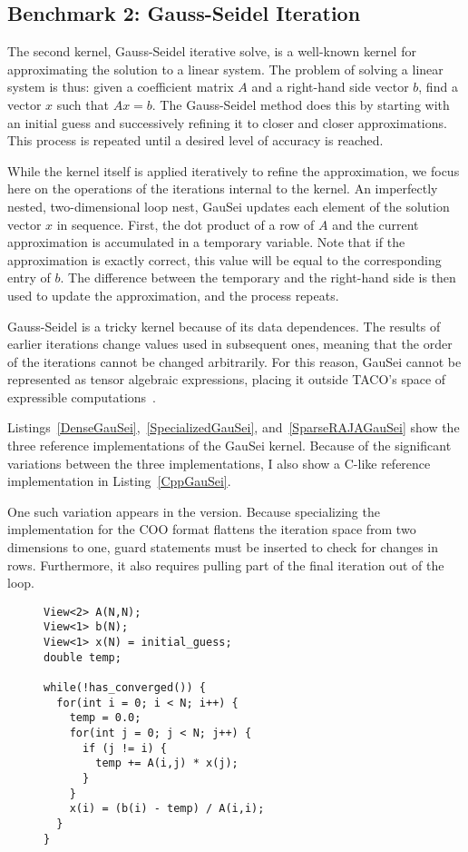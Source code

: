 \subsection{Benchmark 2: Gauss-Seidel Iteration}

The second kernel, Gauss-Seidel iterative solve, is a well-known kernel for approximating the solution to a linear system.
The problem of solving a linear system is thus: given a coefficient matrix $A$ and a right-hand side vector $b$, find a vector $x$ such that $Ax=b$.
The Gauss-Seidel method does this by starting with an initial guess and successively refining it to closer and closer approximations.
This process is repeated until a desired level of accuracy is reached.

While the kernel itself is applied iteratively to refine the approximation, we focus here on the operations of the iterations internal to the kernel.
An imperfectly nested, two-dimensional loop nest, GauSei updates each element of the solution vector $x$ in sequence.
First, the dot product of a row of $A$ and the current approximation is accumulated in a temporary variable.
Note that if the approximation is exactly correct, this value will be equal to the corresponding entry of $b$. 
The difference between the temporary and the right-hand side is then used to update the approximation, and the process repeats.

Gauss-Seidel is a tricky kernel because of its data dependences.
The results of earlier iterations change values used in subsequent ones, meaning that the order of the iterations cannot be changed arbitrarily. 
For this reason, GauSei cannot be represented as tensor algebraic expressions, placing it outside TACO's space of expressible computations~\cite{}.

Listings~\ref{DenseGauSei},~\ref{SpecializedGauSei}, and~\ref{SparseRAJAGauSei} show the three reference implementations of the GauSei kernel.
Because of the significant variations between the three implementations, I also show a C-like reference implementation in Listing~\ref{CppGauSei}.

One such variation appears in the \specialized{} version. 
Because specializing the implementation for the COO format flattens the iteration space from two dimensions to one, guard statements must be inserted to check for changes in rows. 
Furthermore, it also requires pulling part of the final iteration out of the loop.

\begin{figure}
\begin{lstlisting}[caption={C-like version of Gauss-Seidel iteration},label=CppGauSei]
View<2> A(N,N);
View<1> b(N);
View<1> x(N) = initial_guess;
double temp;

while(!has_converged()) {
  for(int i = 0; i < N; i++) {
    temp = 0.0;
    for(int j = 0; j < N; j++) {
      if (j != i) {
        temp += A(i,j) * x(j);
      }
    }
    x(i) = (b(i) - temp) / A(i,i);
  }
}
\end{lstlisting}
\end{figure}

